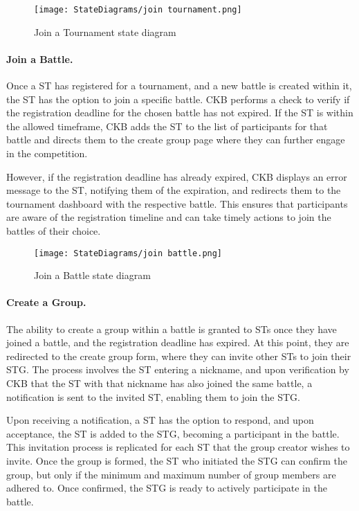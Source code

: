 \begin{figure}[H]
    \begin{center}
        \texttt{[image: StateDiagrams/join tournament.png]}
        \caption{Join a Tournament state diagram}
        \label{fig:join_tournament_sd}%
    \end{center}
\end{figure}

\paragraph{Join a Battle.}
Once a ST has registered for a tournament, and a new battle is created within it, the ST has the option to join a specific battle. CKB performs a check to verify if the registration deadline for the chosen battle has not expired. If the ST is within the allowed timeframe, CKB adds the ST to the list of participants for that battle and directs them to the create group page where they can further engage in the competition.

However, if the registration deadline has already expired, CKB displays an error message to the ST, notifying them of the expiration, and redirects them to the tournament dashboard with the respective battle. This ensures that participants are aware of the registration timeline and can take timely actions to join the battles of their choice.

\begin{figure}[H]
    \begin{center}
        \texttt{[image: StateDiagrams/join battle.png]}
        \caption{Join a Battle state diagram}
        \label{fig:join_battle_sd}%
    \end{center}
\end{figure}

\paragraph{Create a Group.}
The ability to create a group within a battle is granted to STs once they have joined a battle, and the registration deadline has expired. At this point, they are redirected to the create group form, where they can invite other STs to join their STG. The process involves the ST entering a nickname, and upon verification by CKB that the ST with that nickname has also joined the same battle, a notification is sent to the invited ST, enabling them to join the STG.

Upon receiving a notification, a ST has the option to respond, and upon acceptance, the ST is added to the STG, becoming a participant in the battle. This invitation process is replicated for each ST that the group creator wishes to invite. Once the group is formed, the ST who initiated the STG can confirm the group, but only if the minimum and maximum number of group members are adhered to. Once confirmed, the STG is ready to actively participate in the battle.

